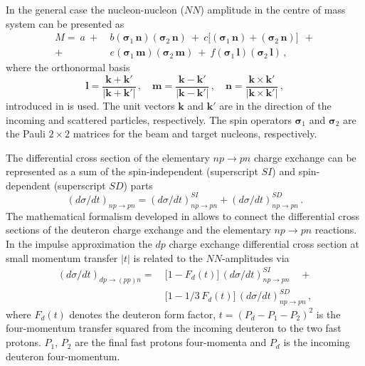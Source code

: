 \documentclass[twocolumn,epjc3]{svjour3}
\newcommand{\np}     {\ensuremath{np \rightarrow pn}\xspace}
\newcommand{\dpchex} {\ensuremath{dp \rightarrow (pp)n}\xspace}
\begin{document}
In the general case the nucleon-nucleon ($NN$) amplitude in the centre of mass
system can be presented as \cite{gla02}
\begin{equation}
  \label{eq:mat_full}
  \begin{split}
    M =\ a\ +\ &b
    (\boldsymbol{\sigma}_1\,\mathbf{n})
    (\boldsymbol{\sigma}_2\,\mathbf{n})\ +\ c\bigl[
    (\boldsymbol{\sigma}_1\,\mathbf{n}) +
    (\boldsymbol{\sigma}_2\,\mathbf{n})\bigr]\ \ + \\
    +\ &e
    (\boldsymbol{\sigma}_1\,\mathbf{m})
    (\boldsymbol{\sigma}_2\,\mathbf{m})\ +\ f
    (\boldsymbol{\sigma}_1\,\mathbf{l})
    (\boldsymbol{\sigma}_2\,\mathbf{l})\,,
  \end{split}
\end{equation}
where the orthonormal basis
\begin{equation}
  \mathbf{l} =
  \frac{\mathbf{k} + \mathbf{k}'}{|\mathbf{k} + \mathbf{k}'|}\,, \quad
  \mathbf{m} =
  \frac{\mathbf{k} - \mathbf{k}'}{|\mathbf{k} - \mathbf{k}'|}\,, \quad
  \mathbf{n} =
  \frac{\mathbf{k} \times \mathbf{k}'}{|\mathbf{k} \times \mathbf{k}'|}\,,
\end{equation}
introduced in \cite{gol66} is used. The unit vectors $\mathbf{k}$ and
$\mathbf{k}'$ are in the direction of the incoming and scattered particles,
respectively. The spin operators $\boldsymbol{\sigma}_1$ and
$\boldsymbol{\sigma}_2$ are the Pauli $2\times2$ matrices for the beam and
target nucleons, respectively.

The differential cross section of the elementary \np charge exchange can be
represented as a sum of the spin-independent (superscript $SI$) and
spin-dependent (superscript $SD$) parts
\begin{equation}
  \label{eq:np_sum}
  (d\sigma/dt)_{\np} = (d\sigma/dt)^{SI}_{\np} + (d\sigma/dt)^{SD}_{\np}\,.
\end{equation}
The mathematical formalism developed in \cite{dea72, dea72_2, bug87} allows to
connect the differential cross sections of the deuteron charge exchange and the
elementary \np reactions. In the impulse approximation the $dp$ charge exchange
differential cross section at small momentum transfer $|t|$ is related to the
$NN$-amplitudes via
\begin{equation}
  \label{eq:dp_13np}
  \begin{split}
    (d\sigma/dt)_{\dpchex} =\ &\bigl[1 - F_d(t)\bigr]\,(d\sigma/dt)^{SI}_{\np}
    \quad + \\
    &\bigl[1 - 1/3\,F_d(t)\bigr]\,(d\sigma/dt)^{SD}_{\np}\,,
  \end{split}
\end{equation}
where $F_d(t)$ denotes the deuteron form factor, $t = (P_d - P_1 - P_2)^2$ is
the four-momentum transfer squared from the incoming deuteron to the two fast
protons. $P_1$, $P_2$ are the final fast protons four-momenta and $P_d$ is the
incoming deuteron four-momentum.
\end{document}
